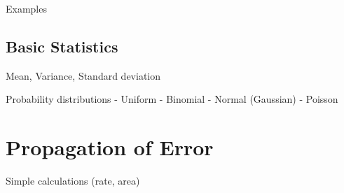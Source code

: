 \documentclass[nobib,nofonts,nols,nohyper]{tufte-handout}
\begin{document}
Examples



\subsection{Basic Statistics} %
\label{sub:basic_statistics}

Mean, 
Variance, 
Standard deviation

Probability distributions
- Uniform
- Binomial
- Normal (Gaussian)
- Poisson



\section{Propagation of Error} %
\label{sec:propagation_of_error}

Simple calculations (rate, area)

\nocite{*}
\printbibliography[category=cited]%

\printbibliography[title={Further Reading},notcategory=cited]
\end{document}

